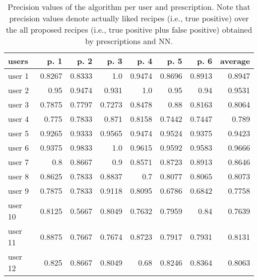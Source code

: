 \begin{table}%
    \centering
    \caption{
        Precision values of the algorithm per user and prescription. Note that precision values denote actually liked recipes (i.e., true positive) over the all proposed recipes (i.e., true positive plus false positive) obtained by prescriptions and NN.
    }
        \begin{tabular}{l||r|r|r|r|r|r||r}
           \textbf{users} & \textbf{p. 1} & \textbf{p. 2} & \textbf{p. 3} & \textbf{p. 4} & \textbf{p. 5} & \textbf{p. 6} & \textbf{average}\\
            \hline\hline
            user 1 & 0.8267 & 0.8333 & 1.0 & 0.9474 & 0.8696 & 0.8913 & 0.8947\\
            user 2 & 0.95 & 0.9474 & 0.931 & 1.0 & 0.95 & 0.94 & 0.9531\\
            user 3 & 0.7875 & 0.7797 & 0.7273 & 0.8478 & 0.88 & 0.8163 & 0.8064\\
            user 4 & 0.775 & 0.7833 & 0.871 & 0.8158 & 0.7442 & 0.7447 & 0.789\\
            user 5 & 0.9265 & 0.9333 & 0.9565 & 0.9474 & 0.9524 & 0.9375 & 0.9423\\
            user 6 & 0.9375 & 0.9833 & 1.0 & 0.9615 & 0.9592 & 0.9583 & 0.9666\\
            user 7 & 0.8 & 0.8667 & 0.9 & 0.8571 & 0.8723 & 0.8913 & 0.8646\\
            user 8 & 0.8625 & 0.7833 & 0.8837 & 0.7 & 0.8077 & 0.8065 & 0.8073\\
            user 9 & 0.7875 & 0.7833 & 0.9118 & 0.8095 & 0.6786 & 0.6842 & 0.7758\\
            user 10 & 0.8125 & 0.5667 & 0.8049 & 0.7632 & 0.7959 & 0.84 & 0.7639\\
            user 11 & 0.8875 & 0.7667 & 0.7674 & 0.8723 & 0.7917 & 0.7931 & 0.8131\\
            user 12 & 0.825 & 0.8667 & 0.8049 & 0.68 & 0.8246 & 0.8364 & 0.8063\\
        \end{tabular}
    \label{tab:proposed-recipes-stats-nn}
\end{table}

